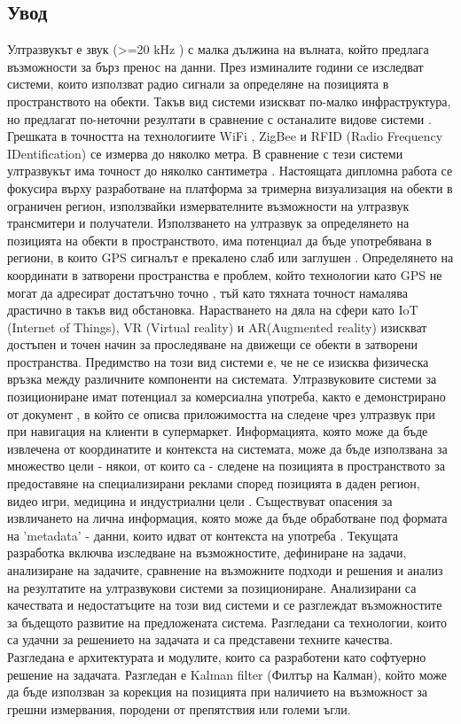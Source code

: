 \subsection{Увод}
\tab Ултразвукът е звук (>=20 kHz \cite{batmobile}) с малка дължина на вълната, който предлага възможности за бърз пренос на данни. През изминалите години се изследват системи, които използват радио сигнали за определяне на позицията в пространството на обекти. Такъв вид системи изискват по-малко инфраструктура, но предлагат по-неточни резултати в сравнение с останалите видове системи \cite{CarlosMedina}. Грешката в точността на технологиите WiFi \cite{wifi}, ZigBee \cite{zigbee} и RFID (Radio Frequency IDentification) \cite{rfid} се измерва до няколко метра. В сравнение с тези системи ултразвукът има точност до няколко сантиметра \cite{CarlosMedina} \cite{columbia}. Настоящата дипломна работа се фокусира върху разработване на платформа за тримерна визуализация на обекти в ограничен регион, използвайки измервателните възможности на ултразвук трансмитери и получатели. Използването на ултразвук за определянето на позицията на обекти в пространството, има потенциал да бъде употребявана в региони, в които GPS сигналът е прекалено слаб или заглушен \cite{yonei}. Определянето на координати в затворени пространства е проблем, който технологии като GPS не могат да адресират достатъчно точно \cite{gpsIsBadIndoor}, тъй като тяхната точност намалява драстично в такъв вид обстановка. Нарастването на дяла на сфери като IoT (Internet of Things), VR (Virtual reality) и AR(Augmented reality) изискват достъпен и точен начин за проследяване на движещи се обекти в затворени пространства. Предимство на този вид системи е, че не се изисква физическа връзка между различните компоненти на системата. Ултразвуковите системи за позициониране имат потенциал за комерсиална употреба, както е демонстрирано от документ \cite{batmobile}, в който се описва приложимостта на следене чрез ултразвук при при навигация на клиенти в супермаркет. Информацията, която може да бъде извлечена от координатите и контекста на системата, може да бъде използвана за множество цели - някои, от които са - следене на позицията в пространството за предоставяне на специализирани реклами според позицията в даден регион, видео игри, медицина и индустриални цели \cite{bristolBeacons}. Съществуват опасения за извличането на лична информация, която може да бъде обработване под формата на 'metadata' - данни, които идват от контекста на употреба \cite{dolphin}. Текущата разработка включва изследване на възможностите, дефиниране на задачи, анализиране на задачите, сравнение на възможните подходи и решения и анализ на резултатите на ултразвукови системи за позициониране. Анализирани са качествата и недостатъците на този вид системи и се разглеждат възможностите за бъдещото развитие на предложената система. Разгледани са технологии, които са удачни за решението на задачата и са представени техните качества. Разгледана е архитектурата и модулите, които са разработени като софтуерно решение на задачата. Разгледан е Kalman filter (Филтър на Калман), който може да бъде използван за корекция на позицията при наличието на възможност за грешни измервания, породени от препятствия или големи ъгли.

